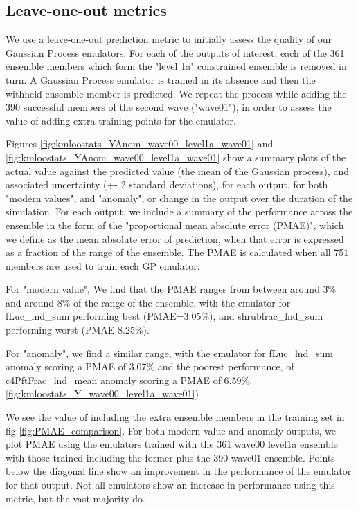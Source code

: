 \documentclass[gmd, manuscript]{copernicus}
\begin{document}
\subsection{Leave-one-out metrics}\label{app:leave_one_out}     %

We use a leave-one-out prediction metric to initially assess the quality of our Gaussian Process emulators. For each of the outputs of interest, each of the 361 ensemble members which form the "level 1a" constrained ensemble is removed in turn. A Gaussian Process emulator is trained in its absence and then the withheld ensemble member is predicted. We repeat the process while adding the 390 successful members of the second wave ("wave01"), in order to assess the value of adding extra training points for the emulator.

Figures \ref{fig:kmloostats_YAnom_wave00_level1a_wave01} and \ref{fig:kmloostats_YAnom_wave00_level1a_wave01}  show a summary plots of the actual value against the predicted value (the mean of the Gaussian process), and associated uncertainty (+- 2 standard deviations), for each output, for both "modern values", and "anomaly", or change in the output over the duration of the simulation. For each output, we include a summary of the performance across the ensemble in the form of the "proportional mean absolute error (PMAE)", which we define as the mean absolute error of prediction, when that error is expressed as a fraction of the range of the ensemble. The PMAE is calculated when all 751 members are used to train each GP emulator.

For "modern value", We find that the PMAE ranges from between around 3\% and around 8\% of the range of the ensemble, with the emulator for fLuc\_lnd\_sum performing best (PMAE=3.05\%), and shrubfrac\_lnd\_sum performing worst (PMAE  8.25\%).

For "anomaly", we find a similar range, with the emulator for fLuc\_lnd\_sum anomaly scoring a PMAE of 3.07\% and the poorest performance, of c4PftFrac\_lnd\_mean anomaly scoring a PMAE of 6.59\%.  \ref{fig:kmloostats_Y_wave00_level1a_wave01}) 

We see the value of including the extra ensemble members in the training set in fig \ref{fig:PMAE_comparison}. For both modern value and anomaly outputs, we plot PMAE using the emulators trained with the 361 wave00 level1a ensemble with those trained including the former plus the 390 wave01 ensemble. Points below the diagonal line show an improvement in the performance of the emulator for that output. Not all emulators show an increase in performance using this metric, but the vast majority do.
\end{document}
